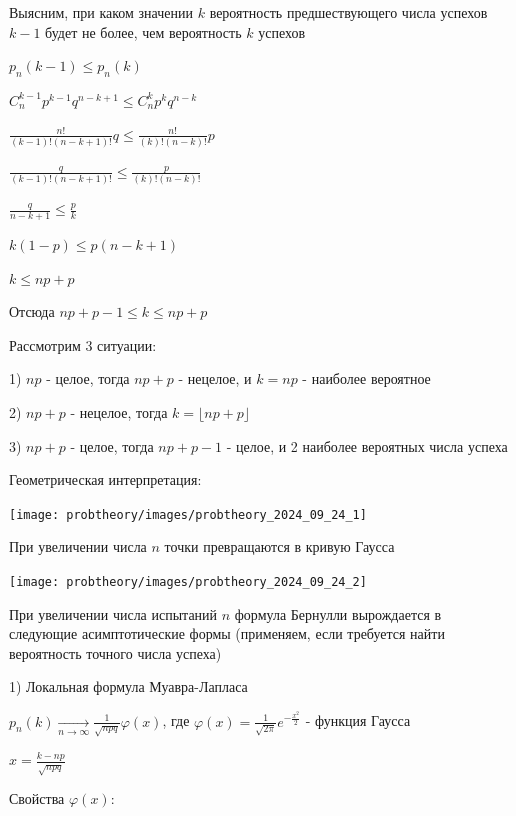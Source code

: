 \documentclass[12pt]{article}
\begin{document}
    Выясним, при каком значении $k$ вероятность предшествующего числа успехов $k - 1$ будет не более, чем вероятность $k$ успехов

    $p_n(k - 1) \leq p_n(k)$

    $C_n^{k - 1} p^{k - 1} q^{n - k + 1} \leq C^k_n p^k q^{n - k}$

    $\frac{n!}{(k - 1)! (n - k + 1)!} q \leq \frac{n!}{(k)! (n - k)!} p$

    $\frac{q}{(k - 1)! (n - k + 1)!} \leq \frac{p}{(k)! (n - k)!}$

    $\frac{q}{n - k + 1} \leq \frac{p}{k}$

    $k(1 - p) \leq p(n - k + 1)$

    $k \leq np + p$

    Отсюда $np + p - 1 \leq k \leq  np + p$

    Рассмотрим 3 ситуации:

    1) $np$ - целое, тогда $np + p$ - нецелое, и $k = np$ - наиболее вероятное

    2) $np + p$ - нецелое, тогда $k = \lfloor np + p \rfloor$

    3) $np + p$ - целое, тогда $np + p - 1$ - целое, и 2 наиболее вероятных числа успеха

    Геометрическая интерпретация:

    \begin{center}
        \texttt{[image: probtheory/images/probtheory\_2024\_09\_24\_1]}
    \end{center}

    При увеличении числа $n$ точки превращаются в кривую Гаусса

    \begin{center}
        \texttt{[image: probtheory/images/probtheory\_2024\_09\_24\_2]}
    \end{center}

    \hypertarget{localformulademoivrelaplace}{}

    При увеличении числа испытаний $n$ формула Бернулли вырождается в следующие асимптотические формы (применяем, если требуется найти вероятность точного числа успеха)

    1) Локальная формула Муавра-Лапласа

    $p_n(k) \underset{n \to \infty}{\longrightarrow} \frac{1}{\sqrt{npq}} \varphi(x)$, где $\varphi(x) = \frac{1}{\sqrt{2\pi}} e^{-\frac{x^2}{2}}$ - функция Гаусса

    $x = \frac{k - np}{\sqrt{npq}}$

    Свойства $\varphi(x)$:
\end{document}

